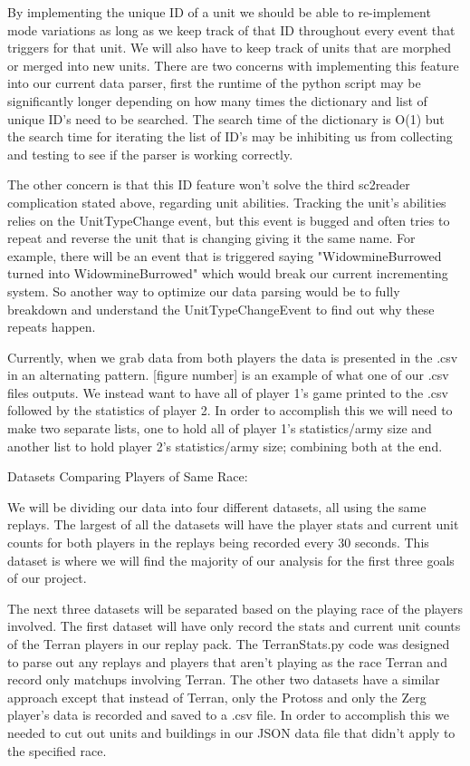 \documentclass[a4paper,12pt]{report}
\begin{document}
By implementing the unique ID of a unit we should be able to re-implement mode variations as long as we keep track of that ID throughout every event that triggers for that unit. We will also have to keep track of units that are morphed or merged into new units.
There are two concerns with implementing this feature into our current data parser, first the runtime of the python script may be significantly longer depending on how many times the dictionary and list of unique ID’s need to be searched. The search time of the dictionary is O(1) but the search time for iterating the list of ID’s may be inhibiting us from collecting and testing to see if the parser is working correctly.

The other concern is that this ID feature won’t solve the third sc2reader complication stated above, regarding unit abilities. Tracking the unit’s abilities relies on the UnitTypeChange event, but this event is bugged and often tries to repeat and reverse the unit that is changing giving it the same name. For example, there will be an event that is triggered saying "WidowmineBurrowed turned into WidowmineBurrowed" which would break our current incrementing system. So another way to optimize our data parsing would be to fully breakdown and understand the UnitTypeChangeEvent to find out why these repeats happen.

Currently, when we grab data from both players the data is presented in the .csv in an alternating pattern. [figure number] is an example of what one of our .csv files outputs. We instead want to have all of player 1’s game printed to the .csv followed by the statistics of player 2. In order to accomplish this we will  need to make two separate lists, one to hold all of player 1’s statistics/army size and another list to hold player 2’s statistics/army size; combining both at the end.

Datasets Comparing Players of Same Race:

We will be dividing our data into four different datasets, all using the same replays. The largest of all the datasets will have the player stats and current unit counts for both players in the replays being recorded every 30 seconds. This dataset is where we will find the majority of our analysis for the first three goals of our project.

The next three datasets will be separated based on the playing race of the players involved. The first dataset will have only record the stats and current unit counts of the Terran players in our replay pack. The TerranStats.py code was designed to parse out any replays and players that aren’t playing as the race Terran and record only matchups involving Terran. The other two datasets have a similar approach except that instead of Terran, only the Protoss and only the Zerg player’s data is recorded and saved to a .csv file. In order to accomplish this we needed to cut out units and buildings in our JSON data file that didn’t apply to the specified race.
\end{document}
